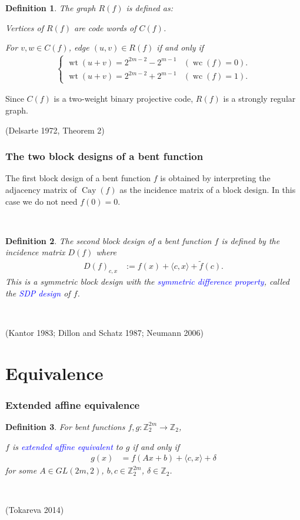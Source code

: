 \documentclass[pdf,sprung,slideColor,nocolorBG]{beamer}
\newenvironment{colortheme}[1]{
\def\ProvidesPackageRCS $##1${\relax}
\renewcommand{\ProcessOptions}{\relax}
\makeatletter

\makeatother
}{}
\newcommand{\slidecite}[1]{\tiny{(#1)}\normalsize{}}
\newcommand{\mb}[1]{\mathbb{#1}}
\newcommand{\Emph}[1]{\emph{\textcolor{blue}{#1}}}
\newcommand{\To}{\rightarrow}
\newcommand{\Cay}[1]{\operatorname{Cay}\left(#1\right)}
\newcommand{\dual}[1]{\widetilde{#1}}
\newcommand{\weight}[1]{\operatorname{wt}\left(#1\right)}
\newcommand{\weightclass}[1]{\operatorname{wc}\left(#1\right)}
\newcommand{\Z}{\mb{Z}}
\newtheorem{Def}{Definition}
\begin{document}
\begin{colortheme}{seagull}
\begin{frame}
\begin{Def}
The graph $R(f)$ is defined as:

Vertices of $R(f)$ are code words of $C(f)$.

For $v,w \in C(f)$, edge $(u,v) \in R(f)$ if and only if
\begin{align*}
\begin{cases}
\weight{u+v} = 2^{2m-2} - 2^{m-1} & (\weightclass{f}=0).
\\
\weight{u+v} = 2^{2m-2} + 2^{m-1} & (\weightclass{f}=1).
\end{cases}
\end{align*}

\end{Def}
Since $C(f)$ is a two-weight binary projective code,
$R(f)$ is a strongly regular graph.

\slidecite{Delsarte 1972, Theorem 2}
\end{frame}
\begin{frame}
\frametitle{The two block designs of a bent function}

The first block design of a bent function $f$ is obtained by interpreting
the adjacency matrix of $\Cay{f}$ as the incidence matrix of a block design.
In this case we do not need $f(0)=0$.

~
\begin{Def}
The second block design of a bent function $f$ is defined by the incidence matrix
$D(f)$ where
\begin{align*}
D(f)_{c,x} &:= f(x) + \langle c, x \rangle + \dual{f}(c).
\end{align*}
This is a symmetric block design with the \Emph{symmetric difference property},
called the \Emph{SDP design} of $f$.
\end{Def}

~

\slidecite{Kantor 1983; Dillon and Schatz 1987; Neumann 2006}
\end{frame}
\end{colortheme}

\section{Equivalence}

\begin{colortheme}{seagull}
\begin{frame}
\frametitle{Extended affine equivalence}

\begin{Def}
For bent functions $f,g : \Z_2^{2m} \To \Z_2$,

$f$ is \Emph{extended affine equivalent} to $g$ if and only if
\begin{align*}
g(x) &= f(A x + b) + \langle c, x \rangle + \delta
\end{align*}
for some $A \in GL(2m,2)$, $b, c \in \Z_2^{2m}$, $\delta \in \Z_2$.
\end{Def}
~

\slidecite{Tokareva 2014}
\end{frame}
\end{colortheme}
\end{document}
